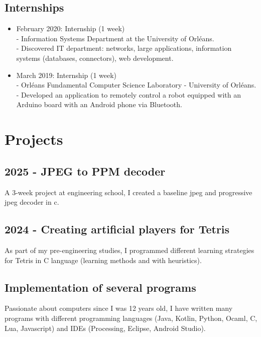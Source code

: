 \documentclass[11pt,oneside,a4paper,titlepage]{article}
\begin{document}
\begin{tcolorbox}
\begin{minipage}[t]{10.6cm}
\begin{tcolorbox}[grow to right by=0.75cm,colframe=white,colback=white]
      \section*{Internships}
      \begin{itemize}
      \item{February 2020: Internship (1 week)\\- Information Systems Department at the University of Orléans.\\- Discovered IT department: networks, large applications, information systems (databases, connectors), web development.}
      \item{March 2019: Internship (1 week)\\- Orléans Fundamental Computer Science Laboratory - University of Orléans.\\- Developed an application to remotely control a robot equipped with an Arduino board with an Android phone via Bluetooth.}
      \end{itemize}
    \end{tcolorbox}
  \end{minipage}
\end{tcolorbox}

\vspace*{-1cm}
\section*{Projects}
\subsection*{2025 - JPEG to PPM decoder}
A 3-week project at engineering school, I created a baseline jpeg and progressive jpeg decoder in c.
\subsection*{2024 - Creating artificial players for Tetris}
As part of my pre-engineering studies, I programmed different learning strategies for Tetris in C language (learning methods and with heuristics).
\subsection*{Implementation of several programs}
Passionate about computers since I was 12 years old, I have written many programs with different programming languages (Java, Kotlin, Python, Ocaml, C, Lua, Javascript) and IDEs (Processing, Eclipse, Android Studio).
\end{document}
